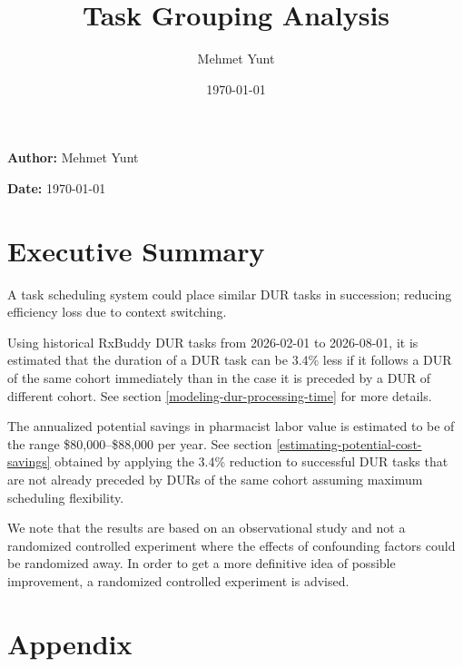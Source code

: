\documentclass[
  10pt,
]{article}
\title{Task Grouping Analysis}
\author{Mehmet Yunt}
\date{\today}
\begin{document}
\thispagestyle{plain}
\par\smallskip
{}\par
\noindent\textbf{Author:} Mehmet Yunt\par
\noindent\textbf{Date:} \today\par\medskip
\section{Executive Summary}\label{abstract}
A task scheduling system could place similar DUR tasks in succession; reducing efficiency loss due to context switching.

Using historical RxBuddy DUR tasks from 2026-02-01 to 2026-08-01, it
is estimated that the duration of a DUR task can be 3.4\% less if it
follows a DUR of the same cohort immediately than in the case it is
preceded by a DUR of different cohort. See section
\ref{modeling-dur-processing-time} for more details.

The annualized potential savings in pharmacist labor value is
estimated to be of the range \$80,000--\$88,000 per year. See section
\ref{estimating-potential-cost-savings} obtained by applying the 3.4\%
reduction to successful DUR tasks that are not already preceded by
DURs of the same cohort assuming maximum scheduling flexibility.

We note that the results are based on an observational study and not a
randomized controlled experiment where the effects of confounding
factors could be randomized away. In order to get a more definitive
idea of possible improvement, a randomized controlled experiment is
advised.

\section{Appendix}\label{appendix}
\localtableofcontents







\end{document}
